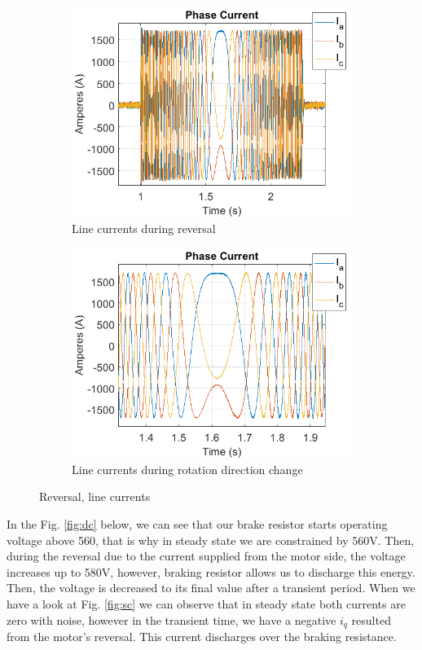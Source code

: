         
\begin{figure}[H]
        \centering
        \begin{subfigure}[b]{0.475\textwidth}
            \centering
            \includegraphics[width = 8 cm]{figs/reverse_phase2.png}
            \caption{Line currents during reversal}
            \label{fig:r11}
        \end{subfigure}
        \hfill
        \begin{subfigure}[b]{0.475\textwidth}  
            \centering 
            \includegraphics[width = 8 cm]{figs/reverse_phase1.png}
            \caption{Line currents during rotation direction change}
            \label{fig:r22}
        \end{subfigure}
        \caption{Reversal, line currents}
        \label{fig:rev_line1}
        \end{figure}

In the Fig. \ref{fig:dc} below, we can see that our brake resistor starts operating voltage above 560, that is why in steady state we are constrained by 560V. Then, during the reversal due to the current supplied from the motor side, the voltage increases up to 580V, however, braking resistor allows us to discharge this energy. Then, the voltage is decreased to its final value after a transient period. When we have a look at Fig. \ref{fig:sc} we can observe that in steady state both currents are zero with noise, however in the transient time, we have a negative $i_q$ resulted from the motor's reversal. This current discharges over the braking resistance.
        
